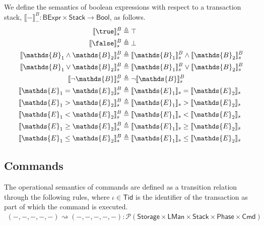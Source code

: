 We define the semantics of boolean expressions with respect to a transaction stack, $\llbracket - \rrbracket_-^B : \mathsf{BExpr} \times \mathsf{Stack} \rightarrow \mathsf{Bool}$, as follows.
\begin{align*}
\llbracket \true \rrbracket_s^B &\triangleq \top \\
\llbracket \false \rrbracket_s^B &\triangleq \bot \\
\llbracket \mathds{B}_1 \land \mathds{B}_2 \rrbracket_s^B &\triangleq \llbracket \mathds{B}_1 \rrbracket_s^B \land \llbracket \mathds{B}_2 \rrbracket_s^B \\
\llbracket \mathds{B}_1 \lor \mathds{B}_2 \rrbracket_s^B &\triangleq \llbracket \mathds{B}_1 \rrbracket_s^B \lor \llbracket \mathds{B}_2 \rrbracket_s^B \\
\llbracket \lnot \mathds{B} \rrbracket_s^B &\triangleq \lnot \llbracket \mathds{B} \rrbracket_s^B \\
\llbracket \mathds{E}_1 = \mathds{E}_2 \rrbracket_s^B &\triangleq \llbracket \mathds{E}_1 \rrbracket_s = \llbracket \mathds{E}_2 \rrbracket_s \\
\llbracket \mathds{E}_1 > \mathds{E}_2 \rrbracket_s^B &\triangleq \llbracket \mathds{E}_1 \rrbracket_s > \llbracket \mathds{E}_2 \rrbracket_s \\
\llbracket \mathds{E}_1 < \mathds{E}_2 \rrbracket_s^B &\triangleq \llbracket \mathds{E}_1 \rrbracket_s < \llbracket \mathds{E}_2 \rrbracket_s \\
\llbracket \mathds{E}_1 \geq \mathds{E}_2 \rrbracket_s^B &\triangleq \llbracket \mathds{E}_1 \rrbracket_s \geq \llbracket \mathds{E}_2 \rrbracket_s \\
\llbracket \mathds{E}_1 \leq \mathds{E}_2 \rrbracket_s^B &\triangleq \llbracket \mathds{E}_1 \rrbracket_s \leq \llbracket \mathds{E}_2 \rrbracket_s \\
\end{align*}

\subsection{Commands}

The operational semantics of commands are defined as a transition relation through the following rules, where $\iota \in \mathsf{Tid}$ is the identifier of the transaction as part of which the command is executed.
\begin{gather*}
(-, -, -, -, -) \rightsquigarrow (-, -, -, -, -) 
: \mathcal{P}(\mathsf{Storage} \times \mathsf{LMan} \times \mathsf{Stack} \times \mathsf{Phase} \times \mathsf{Cmd})
\end{gather*}

